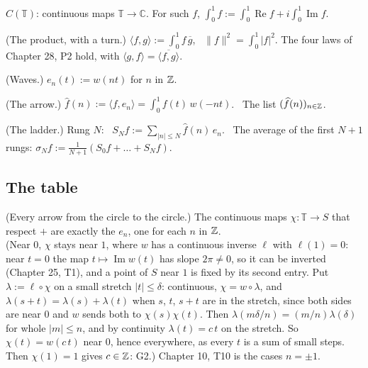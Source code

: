 \begin{lines}
\item[\lab{D1}] $C(\mathbb{T})$: continuous maps $\mathbb{T} \to \mathbb{C}$. For such $f$, $\int_0^1 f := \int_0^1 \operatorname{Re} f + i \int_0^1 \operatorname{Im} f$.
\item[\lab{D2}] (The product, with a turn.) $\langle f, g \rangle := \int_0^1 f\,\overline{g}$, \ $\|f\|^2 = \int_0^1 |f|^2$. The four laws of Chapter 28, P2 hold, with $\langle g, f \rangle = \overline{\langle f, g \rangle}$.
\item[\lab{D3}] (Waves.) $e_n(t) := w(n t)$ for $n$ in $\mathbb{Z}$.
\item[\lab{D4}] (The arrow.) $\widehat{f}(n) := \langle f, e_n \rangle = \int_0^1 f(t)\, w(-n t)$. \ The list $(\widehat{f}(n))_{n \in \mathbb{Z}}$.
\item[\lab{D5}] (The ladder.) Rung $N$: \ $S_N f := \sum_{|n| \le N} \widehat{f}(n)\, e_n$. \ The average of the first $N + 1$ rungs: $\sigma_N f := \frac{1}{N+1}(S_0 f + \dots + S_N f)$.
\end{lines}

\subsection*{The table}

\begin{lines}
\item[\lab{T1}] (Every arrow from the circle to the circle.) The continuous maps $\chi : \mathbb{T} \to S$ that respect $+$ are exactly the $e_n$, one for each $n$ in $\mathbb{Z}$. \\
(Near $0$, $\chi$ stays near $1$, where $w$ has a continuous inverse $\ell$ with $\ell(1) = 0$: near $t = 0$ the map $t \mapsto \operatorname{Im} w(t)$ has slope $2\pi \ne 0$, so it can be inverted (Chapter 25, T1), and a point of $S$ near $1$ is fixed by its second entry. Put $\lambda := \ell \circ \chi$ on a small stretch $|t| \le \delta$: continuous, $\chi = w \circ \lambda$, and $\lambda(s + t) = \lambda(s) + \lambda(t)$ when $s$, $t$, $s + t$ are in the stretch, since both sides are near $0$ and $w$ sends both to $\chi(s)\chi(t)$. Then $\lambda(m \delta / n) = (m/n)\lambda(\delta)$ for whole $|m| \le n$, and by continuity $\lambda(t) = c\,t$ on the stretch. So $\chi(t) = w(c\,t)$ near $0$, hence everywhere, as every $t$ is a sum of small steps. Then $\chi(1) = 1$ gives $c \in \mathbb{Z}$: G2.) Chapter 10, T10 is the cases $n = \pm 1$.
\end{lines}


